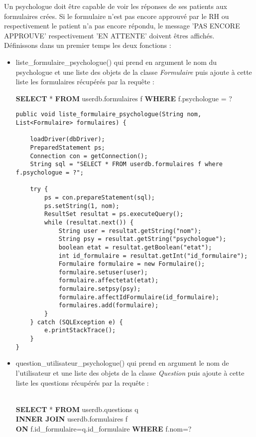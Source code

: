 \documentclass[12]{article}
\begin{document}
Un psychologue doit être capable de voir les réponses de ses patients aux formulaires crées. Si le formulaire n'est pas encore approuvé par le RH ou respectivement le patient n'a pas encore répondu, le message 'PAS ENCORE APPROUVE' respectivement 'EN ATTENTE' doivent êtres affichés.\\
Définissons dans un premier temps les deux fonctions :\\
\begin{itemize}
\item liste\_formulaire\_psychologue() qui prend en argument le nom du psychologue et une liste des objets de la classe \textit{Formulaire} puis ajoute à cette liste les formulaires récupérés par la requête :\\

\begin{scriptsize}
\textbf{SELECT} * \textbf{FROM} userdb.formulaires f \textbf{WHERE} f.psychologue = ?
\end{scriptsize}

\begin{scriptsize}

\begin{lstlisting}
public void liste_formulaire_psychologue(String nom, List<Formulaire> formulaires) {

	loadDriver(dbDriver);
	PreparedStatement ps;
	Connection con = getConnection();
	String sql = "SELECT * FROM userdb.formulaires f where f.psychologue = ?";

	try {
		ps = con.prepareStatement(sql);
		ps.setString(1, nom);
		ResultSet resultat = ps.executeQuery();
		while (resultat.next()) {
			String user = resultat.getString("nom");
			String psy = resultat.getString("psychologue");
			boolean etat = resultat.getBoolean("etat");
			int id_formulaire = resultat.getInt("id_formulaire");
			Formulaire formulaire = new Formulaire();
			formulaire.setuser(user);
			formulaire.affectetat(etat);
			formulaire.setpsy(psy);
			formulaire.affectIdFormulaire(id_formulaire);
			formulaires.add(formulaire);
		}
	} catch (SQLException e) {
		e.printStackTrace();
	}
}
\end{lstlisting}



\end{scriptsize}





\item question\_utilisateur\_psychologue() qui prend en argument le nom de l'utilisateur et une liste des objets de la classe \textit{Question} puis ajoute à cette liste les questions récupérés par la requête :\\\\
\begin{scriptsize}
\textbf{SELECT} * \textbf{FROM} userdb.questions q \\
\textbf{INNER JOIN} userdb.formulaires f \\
\textbf{ON} f.id\_formulaire=q.id\_formulaire \textbf{WHERE} f.nom=?
\end{scriptsize}

\end{itemize}
\end{document}
